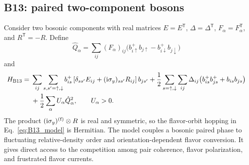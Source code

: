 \documentclass[onecolumn,aps,prb,amsmath,amssymb,superscriptaddress,longbibliography,floatfix]{revtex4-2}
\newcommand{\ii}{\mathrm{i}}
\newcommand{\trans}{\mathsf{T}}
\begin{document}
\subsection*{B13: paired two-component bosons}

Consider two bosonic components with real matrices
\(E=E^\trans\), \(\Delta=\Delta^\trans\), \(F_\alpha=F_\alpha^\trans\), and \(R^\trans=-R\).  Define
\begin{equation}
\hat Q_\alpha
=\sum_{ij}(F_\alpha)_{ij}
\bigl(b_{i\uparrow}^+b_{j\uparrow}
-b_{i\downarrow}^+b_{j\downarrow}\bigr)
\end{equation}
and
\begin{align}
H_{\rm B13}={}&
\sum_{ij}\sum_{s,s'=\uparrow,\downarrow}
b_{is}^+\left[\delta_{ss'}E_{ij}
+(\ii\sigma_y)_{ss'}R_{ij}\right]b_{js'}
+\frac12\sum_{s=\uparrow,\downarrow}\sum_{ij}\Delta_{ij}
\bigl(b_{is}^+b_{js}^++b_{is}b_{js}\bigr)\notag\\*
&+\frac12\sum_\alpha U_\alpha\hat Q_\alpha^2,
\qquad U_\alpha>0.
\label{eq:B13_model}
\end{align}
The product \((\ii\sigma_y)^{({\rm f})}\otimes R\) is real and symmetric, so the flavor-orbit hopping in Eq.~\eqref{eq:B13_model} is Hermitian.  The model couples a bosonic paired phase to fluctuating relative-density order and orientation-dependent flavor conversion.  It gives direct access to the competition among pair coherence, flavor polarization, and frustrated flavor currents.
\end{document}

